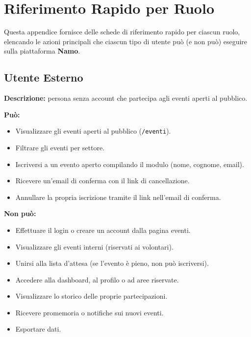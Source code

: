 \documentclass[a4paper,11pt,oneside]{book}
\newcommand{\namo}{\textbf{Namo}}
\newcommand{\percorso}[1]{\textcolor{namoCyan}{\texttt{#1}}}
\begin{document}
\chapter{Riferimento Rapido per Ruolo}
\label{ch:riferimento-rapido}

Questa appendice fornisce delle schede di riferimento rapido per ciascun ruolo, elencando le azioni principali che ciascun tipo di utente pu\`o (e non pu\`o) eseguire sulla piattaforma \namo{}.

\section{Utente Esterno}
\label{sec:quick-esterno}

\begin{tcolorbox}[
  enhanced,
  colback=namoLightOrange,
  colframe=namoOrange,
  coltitle=white,
  fonttitle=\bfseries\large,
  title={Scheda rapida --- Utente Esterno},
  left=8pt, right=8pt, top=8pt, bottom=8pt,
  arc=6pt,
  boxrule=1pt,
]

\textbf{Descrizione:} persona senza account che partecipa agli eventi aperti al pubblico.

\vspace{0.5em}
\textbf{Pu\`o:}
\begin{itemize}[leftmargin=1.5em, topsep=2pt, itemsep=2pt]
  \item Visualizzare gli eventi aperti al pubblico (\percorso{/eventi}).
  \item Filtrare gli eventi per settore.
  \item Iscriversi a un evento aperto compilando il modulo (nome, cognome, email).
  \item Ricevere un'email di conferma con il link di cancellazione.
  \item Annullare la propria iscrizione tramite il link nell'email di conferma.
\end{itemize}

\vspace{0.5em}
\textbf{Non pu\`o:}
\begin{itemize}[leftmargin=1.5em, topsep=2pt, itemsep=2pt]
  \item Effettuare il login o creare un account dalla pagina eventi.
  \item Visualizzare gli eventi interni (riservati ai volontari).
  \item Unirsi alla lista d'attesa (se l'evento \`e pieno, non pu\`o iscriversi).
  \item Accedere alla dashboard, al profilo o ad aree riservate.
  \item Visualizzare lo storico delle proprie partecipazioni.
  \item Ricevere promemoria o notifiche sui nuovi eventi.
  \item Esportare dati.
\end{itemize}


\end{tcolorbox}
\end{document}
